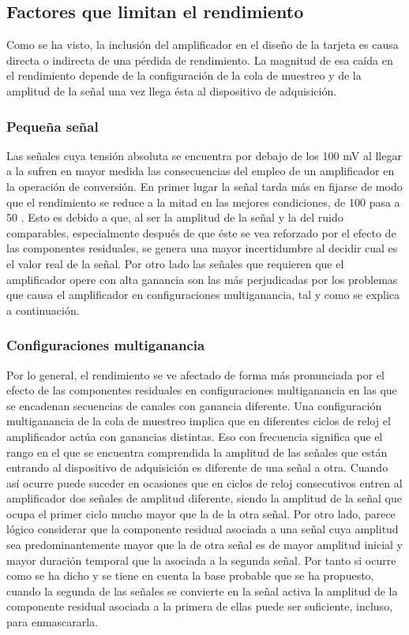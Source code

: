 \subsection{Factores que limitan el rendimiento}

Como se ha visto, la inclusión del amplificador en el diseño de la tarjeta
es causa directa o indirecta de una pérdida de rendimiento. La magnitud de
esa caída en el rendimiento depende de la configuración de la cola de
muestreo y de la amplitud de la señal una vez llega ésta al dispositivo de
adquisición.


\subsubsection{Pequeña señal}

Las señales cuya tensión absoluta se encuentra por debajo de los 100 mV al
llegar a la \kpci{} sufren en mayor medida las consecuencias del empleo de
un amplificador en la operación de conversión. En primer lugar la señal
tarda más en fijarse de modo que el rendimiento se reduce a la mitad en las
mejores condiciones, de 100 \kms{} pasa a 50 \kms{}. Esto es debido a que,
al ser la amplitud de la señal y la del ruido comparables, especialmente
después de que éste se vea reforzado por el efecto de las componentes
residuales, se genera una mayor incertidumbre al decidir cual es el valor
real de la señal. Por otro lado las señales que requieren que el
amplificador opere con alta ganancia son las más perjudicadas por los
problemas que causa el amplificador en configuraciones multiganancia, tal y
como se explica a continuación.


\subsubsection{Configuraciones multiganancia}

Por lo general, el rendimiento se ve afectado de forma más pronunciada por
el efecto de las componentes residuales en configuraciones multiganancia en
las que se encadenan secuencias de canales con ganancia diferente. Una
configuración multiganancia de la cola de muestreo implica que en
diferentes ciclos de reloj el amplificador actúa con ganancias distintas.
Eso con frecuencia significa que el rango en el que se encuentra
comprendida la amplitud de las señales que están entrando al dispositivo de
adquisición es diferente de una señal a otra. Cuando así ocurre puede
suceder en ocasiones que en ciclos de reloj consecutivos entren al
amplificador dos señales de amplitud diferente, siendo la amplitud de la
señal que ocupa el primer ciclo mucho mayor que la de la otra señal. Por
otro lado, parece lógico considerar que la componente residual asociada a
una señal cuya amplitud sea predominantemente mayor que la de otra señal es
de mayor amplitud inicial y mayor duración temporal que la asociada a la
segunda señal. Por tanto si ocurre como se ha dicho y se tiene en cuenta la
base probable que se ha propuesto, cuando la segunda de las señales se
convierte en la señal activa la amplitud de la componente residual asociada
a la primera de ellas puede ser suficiente, incluso, para enmascararla.

